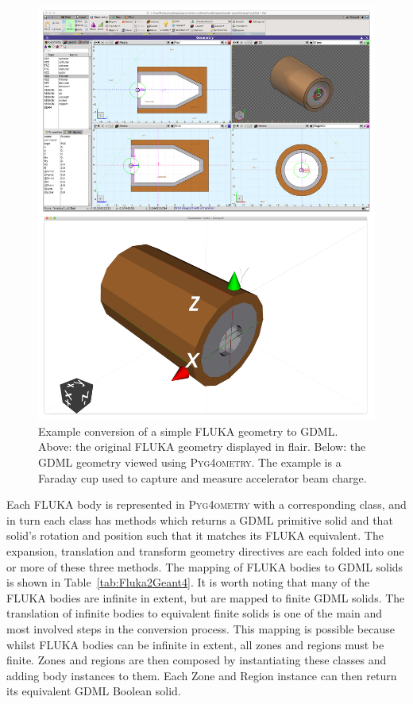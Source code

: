 \documentclass[final,5p,times,twocolumn]{elsarticle}
\newcommand{\PYGEOMETRY}{\textsc{Pyg4ometry}}
\begin{document}
\begin{figure}[htbp]
\begin{center}
\includegraphics[width=0.9\columnwidth]{./model-scene/faradayCup2.pdf}
\caption{Example conversion of a simple FLUKA geometry to GDML. Above:
the original FLUKA geometry displayed in flair. Below: the GDML geometry
viewed using \PYGEOMETRY{}. The example is a Faraday cup used to capture
and measure accelerator beam charge.}
\label{fig:fluka-to-geant4-cup}
\end{center}
\end{figure}

Each FLUKA body is represented in \PYGEOMETRY{} with a corresponding
class, and in turn each class has methods which returns a GDML
primitive solid and that solid's rotation and position such that it
matches its FLUKA equivalent.  The expansion, translation and
transform geometry directives are each folded into one or more of
these three methods.  The mapping of FLUKA bodies to GDML solids is
shown in Table~\ref{tab:Fluka2Geant4}.  It is worth noting that many
of the FLUKA bodies are infinite in extent, but are mapped to finite
GDML solids.  The translation of infinite bodies to equivalent finite
solids is one of the main and most involved steps in the conversion process.
This mapping is possible because whilst FLUKA bodies can be infinite
in extent, all zones and regions must be finite.  Zones and regions
are then composed by instantiating these classes and adding body
instances to them.  Each Zone and Region instance can then return its
equivalent GDML Boolean solid.
\end{document}
